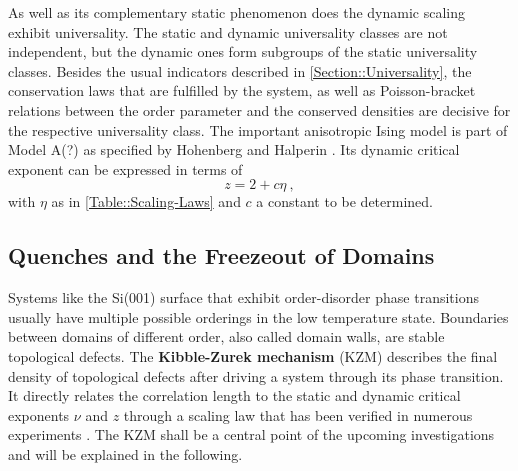 	As well as its complementary static phenomenon does the dynamic scaling exhibit universality. The static and dynamic universality classes are not independent, but the dynamic ones form subgroups of the static universality classes. Besides the usual indicators described in \autoref{Section::Universality}, the conservation laws that are fulfilled by the system, as well as Poisson-bracket relations between the order parameter and the conserved densities are decisive for the respective universality class. The important anisotropic Ising model is part of Model A(?) as specified by Hohenberg and Halperin \cite{hohenberg1977theory}. Its dynamic critical exponent can be expressed in terms of
	\begin{equation}
		z =	2 + c \eta ~,
	\end{equation}
	with $\eta$ as in \autoref{Table::Scaling-Laws} and $c$ a constant to be determined.
	\subsection{Quenches and the Freezeout of Domains}
	Systems like the Si(001) surface that exhibit order-disorder phase transitions usually have multiple possible orderings in the low temperature state. Boundaries between domains of different order, also called domain walls, are stable topological defects. The \textbf{Kibble-Zurek mechanism} (KZM) \cite{kibble1976topology, zurek1985cosmological, zurek1996cosmological} describes the final density of topological defects after driving a system through its phase transition. It directly relates the correlation length to the static and dynamic critical exponents $\nu$ and $z$ through a scaling law that has been verified in numerous experiments \cite{ruutu1996vortex, ulm2013observation, pyka2013topological}. The KZM shall be a central point of the upcoming investigations and will be explained in the following. \\
	

